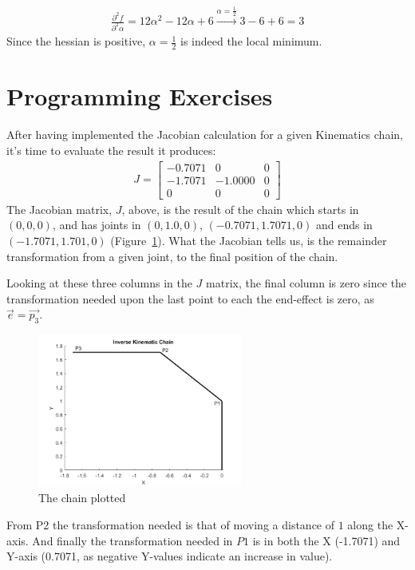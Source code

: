 \documentclass[11pt]{article} %
\begin{document}
\begin{gather*}
\frac{\partial^2 f}{\partial^2 \alpha} = 12 \alpha ^2 - 12 \alpha + 6 \xrightarrow[]{\alpha = \frac{1}{2}}3-6+6 = 3
\end{gather*}
Since the hessian is positive, $\alpha = \frac{1}{2}$ is indeed the local minimum.
\newpage
\section*{Programming Exercises}
After having implemented the Jacobian calculation for a given Kinematics chain, it's time to evaluate the result it produces:
\begin{gather*}
J=\begin{bmatrix}-0.7071&0&0\\
-1.7071&-1.0000&0\\
0&0&0\end{bmatrix}
\end{gather*}
The Jacobian matrix, $J$, above, is the result of the chain 
which starts in $(0,0,0)$, and has joints in $(0,1.0,0)$, $(-0.7071, 1.7071, 0)$ and ends in $(-1.7071, 1.701, 0)$ (Figure~\ref{fig:chain}). What the Jacobian tells us, is the remainder transformation from a given joint, to the final position of the chain.

Looking at these three columns in the $J$ matrix, the final column is zero since the transformation needed upon the last point to each the end-effect is zero, as $\overrightarrow{e} = \overrightarrow{p_3}$.

\begin{figure}[H]
    \centering
    \includegraphics[width=0.6\textwidth]{ik_inv}
    \caption{The chain plotted}
    \label{fig:chain}
\end{figure}

From P2 the transformation needed is that of moving a distance of $1$ along the X-axis. And finally the transformation needed in $P1$ is in both the X (-1.7071) and Y-axis (0.7071, as negative Y-values indicate an increase in value).
\end{document}
